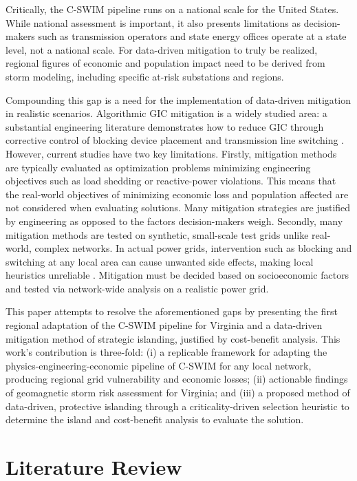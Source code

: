\documentclass[draft]{agujournal2019}
\begin{document}
Critically, the C-SWIM pipeline runs on a national scale for the United States. While national assessment is important, it also presents limitations as decision-makers such as transmission operators and state energy offices operate at a state level, not a national scale. For data-driven mitigation to truly be realized, regional figures of economic and population impact need to be derived from storm modeling, including specific at-risk substations and regions.

Compounding this gap is a need for the implementation of data-driven mitigation in realistic scenarios. Algorithmic GIC mitigation is a widely studied area: a substantial engineering literature demonstrates how to reduce GIC through corrective control of blocking device placement and transmission line switching \cite{Kazerooni2019}. However, current studies have two key limitations. Firstly, mitigation methods are typically evaluated as optimization problems minimizing engineering objectives such as load shedding or reactive-power violations. This means that the real-world objectives of minimizing economic loss and population affected are not considered when evaluating solutions. Many mitigation strategies are justified by engineering as opposed to the factors decision-makers weigh. Secondly, many mitigation methods are tested on synthetic, small-scale test grids unlike real-world, complex networks. In actual power grids, intervention such as blocking and switching at any local area can cause unwanted side effects, making local heuristics unreliable \cite{Schachinger2023}. Mitigation must be decided based on socioeconomic factors and tested via network-wide analysis on a realistic power grid. 

This paper attempts to resolve the aforementioned gaps by presenting the first regional adaptation of the C-SWIM pipeline for Virginia and a data-driven mitigation method of strategic islanding, justified by cost-benefit analysis. This work's contribution is three-fold: (i) a replicable framework for adapting the physics-engineering-economic pipeline of C-SWIM for any local network, producing regional grid vulnerability and economic losses; (ii) actionable findings of geomagnetic storm risk assessment for Virginia; and (iii) a proposed method of data-driven, protective islanding through a criticality-driven selection heuristic to determine the island and cost-benefit analysis to evaluate the solution.
\clearpage

\section{Literature Review}\label{sec:litreview}
\end{document}
